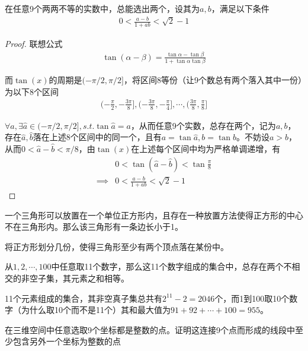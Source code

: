 \begin{example}
  在任意9个两两不等的实数中，总能选出两个，设其为$a,b$，满足以下条件
  \begin{align*}
    0 < \frac{a-b}{1+ab} < \sqrt2 -1
  \end{align*}
\end{example}

\begin{proof}
  联想公式
  \begin{align*}
    \tan(\alpha-\beta)=\frac{\tan\alpha-\tan\beta}{1+\tan\alpha\tan\beta}
  \end{align*}

  而$\tan(x)$的周期是$(-\pi/2, \pi/2]$，将区间8等份（让9个数总有两个落入其中一份）为以下8个区间
  \begin{align*}
    (-\frac\pi2, -\frac{3\pi}8], (-\frac{3\pi}8, -\frac\pi4], \cdots, (\frac{3\pi}8, \frac\pi8]
  \end{align*}

  $\forall a, \exists\hat a\in(-\pi/2, \pi/2], s.t. \tan\hat a = a$，从而任意9个实数，总存在两个，记为$a,b$，存在$\hat a, \hat b$落在上述8个区间中的同一个，且有$a=\tan\hat a, b=\tan\hat b$。不妨设$a>b$，从而$0<\hat a-\hat b<\pi/8$，由$\tan(x)$在上述每个区间中均为严格单调递增，有
  \begin{align*}
             & 0 < \tan(\hat a - \hat b) < \tan\frac\pi8\\
    \implies & 0 < \frac{a - b}{1+ab} < \sqrt2 - 1
  \end{align*}
\end{proof}


\begin{question}
  一个三角形可以放置在一个单位正方形内，且存在一种放置方法使得正方形的中心不在三角形内。那么该三角形有一条边长小于1。
\end{question}

\hints 将正方形划分几份，使得三角形至少有两个顶点落在某份中。

\begin{question}
  从$1,2,\cdots,100$中任意取11个数字，那么这11个数字组成的集合中，总存在两个不相交的非空子集，其元素之和相等。
\end{question}

\hints 11个元素组成的集合，其非空真子集总共有$2^{11}-2=2046$个，而1到100取10个数字（\think 为什么取10个而不是11个）其和最大值为$91+92+\cdots+100=955$。

\begin{question}
  在三维空间中任意选取9个坐标都是整数的点。证明这连接9个点而形成的线段中至少包含另外一个坐标为整数的点
\end{question}

